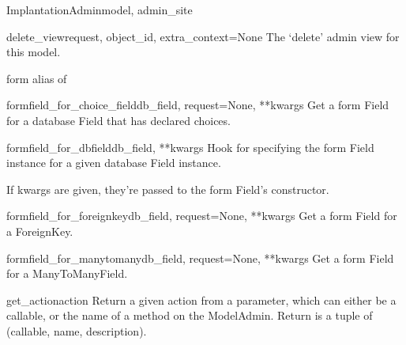 \documentclass[letterpaper,10pt,english]{sphinxmanual}
\begin{document}
\begin{classdesc}{ImplantationAdmin}{model, admin\_site}
\hypertarget{data.admin.ImplantationAdmin.delete_view}{}\begin{methoddesc}{delete\_view}{request, object\_id, extra\_context=None}
The `delete' admin view for this model.
\end{methoddesc}

\hypertarget{data.admin.ImplantationAdmin.form}{}\begin{memberdesc}{form}
alias of 
\end{memberdesc}

\hypertarget{data.admin.ImplantationAdmin.formfield_for_choice_field}{}\begin{methoddesc}{formfield\_for\_choice\_field}{db\_field, request=None, **kwargs}
Get a form Field for a database Field that has declared choices.
\end{methoddesc}

\hypertarget{data.admin.ImplantationAdmin.formfield_for_dbfield}{}\begin{methoddesc}{formfield\_for\_dbfield}{db\_field, **kwargs}
Hook for specifying the form Field instance for a given database Field
instance.

If kwargs are given, they're passed to the form Field's constructor.
\end{methoddesc}

\hypertarget{data.admin.ImplantationAdmin.formfield_for_foreignkey}{}\begin{methoddesc}{formfield\_for\_foreignkey}{db\_field, request=None, **kwargs}
Get a form Field for a ForeignKey.
\end{methoddesc}

\hypertarget{data.admin.ImplantationAdmin.formfield_for_manytomany}{}\begin{methoddesc}{formfield\_for\_manytomany}{db\_field, request=None, **kwargs}
Get a form Field for a ManyToManyField.
\end{methoddesc}

\hypertarget{data.admin.ImplantationAdmin.get_action}{}\begin{methoddesc}{get\_action}{action}
Return a given action from a parameter, which can either be a callable,
or the name of a method on the ModelAdmin.  Return is a tuple of
(callable, name, description).
\end{methoddesc}


\end{classdesc}
\end{document}

